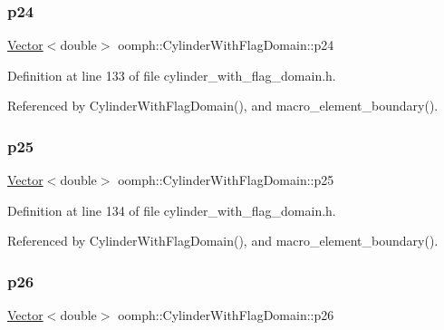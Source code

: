 \subsubsection{\texorpdfstring{p24}{p24}}
{\footnotesize\ttfamily \hyperlink{classoomph_1_1Vector}{Vector}$<$double$>$ oomph\+::\+Cylinder\+With\+Flag\+Domain\+::p24\hspace{0.3cm}{\ttfamily [private]}}



Definition at line 133 of file cylinder\+\_\+with\+\_\+flag\+\_\+domain.\+h.



Referenced by Cylinder\+With\+Flag\+Domain(), and macro\+\_\+element\+\_\+boundary().

\mbox{\label{classoomph_1_1CylinderWithFlagDomain_abbcbd7a97f86134091e3750f04a3fdfd}} 
\subsubsection{\texorpdfstring{p25}{p25}}
{\footnotesize\ttfamily \hyperlink{classoomph_1_1Vector}{Vector}$<$double$>$ oomph\+::\+Cylinder\+With\+Flag\+Domain\+::p25\hspace{0.3cm}{\ttfamily [private]}}



Definition at line 134 of file cylinder\+\_\+with\+\_\+flag\+\_\+domain.\+h.



Referenced by Cylinder\+With\+Flag\+Domain(), and macro\+\_\+element\+\_\+boundary().

\mbox{\label{classoomph_1_1CylinderWithFlagDomain_a85707f0839cd70631c82d9254ed8c5d0}} 
\subsubsection{\texorpdfstring{p26}{p26}}
{\footnotesize\ttfamily \hyperlink{classoomph_1_1Vector}{Vector}$<$double$>$ oomph\+::\+Cylinder\+With\+Flag\+Domain\+::p26\hspace{0.3cm}{\ttfamily [private]}}



